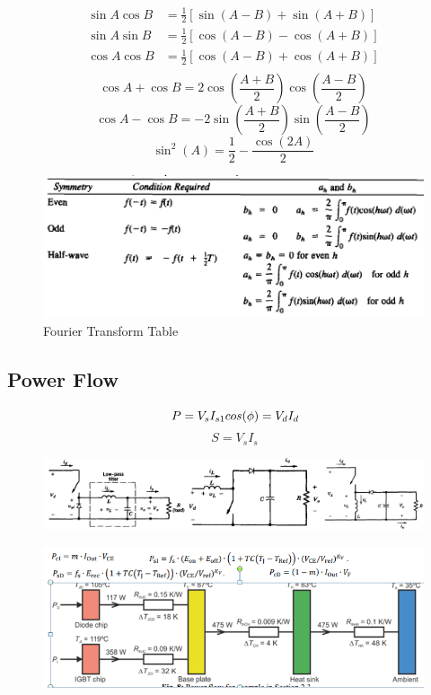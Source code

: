 \documentclass[twocolumn, ]{article}
\begin{document}
\begin{align*}
          \sin A \cos B &= \frac{1}{2}\left[ \sin(A-B)+\sin(A+B) \right] \\
          \sin A \sin B &= \frac{1}{2}\left[ \cos(A-B)-\cos(A+B) \right] \\
          \cos A \cos B &= \frac{1}{2}\left[ \cos(A-B)+\cos(A+B) \right] \\     
\end{align*}  
\begin{equation*}
	  \cos A +\cos B = 2\cos(\frac{A+B}{2})\cos(\frac{A-B}{2})
\end{equation*}
\begin{equation*}
	  \cos A -\cos B = -2\sin(\frac{A+B}{2})\sin(\frac{A-B}{2})
\end{equation*}
\begin{equation*}
	\sin^2(A)=\frac{1}{2}-\frac{\cos(2A)}{2}
\end{equation*}
  \begin{figure}[!ht]
	\includegraphics[scale=0.35]{Fourier.png}
	\caption{Fourier Transform Table}
\end{figure}
\subsection*{\small Power Flow}
\begin{equation*}
	\ P=V_{s}I_{s1}cos(\phi)=V_{d}I_{d}\\	
\end{equation*}
\begin{equation*}
	\ S=V_{s}I_{s}	
\end{equation*}

\begin{figure}[!ht]
	\includegraphics[scale=0.3]{buck_boost.jpg}
\end{figure}

\begin{figure}
	\includegraphics[scale=0.65]{heat}
\end{figure}
\end{document}
